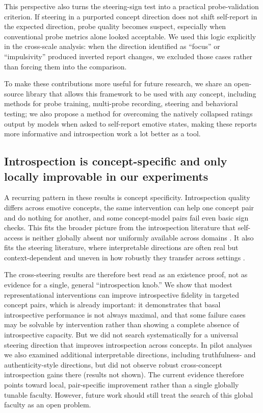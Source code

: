 \documentclass[10pt]{article}
\begin{document}
This perspective also turns the steering-sign test into a practical probe-validation criterion.
If steering in a purported concept direction does not shift self-report in the expected direction, probe quality becomes suspect, especially when conventional probe metrics alone looked acceptable.
We used this logic explicitly in the cross-scale analysis: when the direction identified as ``focus'' or ``impulsivity'' produced inverted report changes, we excluded those cases rather than forcing them into the comparison.

To make these contributions more useful for future research, we share an open-source library that allows this framework to be used with any concept, including methods for probe training, multi-probe recording, steering and behavioral testing; we also propose a method for overcoming the natively collapsed ratings output by models when asked to self-report emotive states, making these reports more informative and introspection work a lot better as a tool.

\subsection{Introspection is concept-specific and only locally improvable in our experiments}

A recurring pattern in these results is concept specificity.
Introspection quality differs across emotive concepts, the same intervention can help one concept pair and do nothing for another, and some concept-model pairs fail even basic sign checks.
This fits the broader picture from the introspection literature that self-access is neither globally absent nor uniformly available across domains \citep{Song2025, Binder2025, JiAn2025}.
It also fits the steering literature, where interpretable directions are often real but context-dependent and uneven in how robustly they transfer across settings \citep{FrisingBalcells2025, Zou2023}.

The cross-steering results are therefore best read as an existence proof, not as evidence for a single, general ``introspection knob.''
We show that modest representational interventions can improve introspective fidelity in targeted concept pairs, which is already important: it demonstrates that basal introspective performance is not always maximal, and that some failure cases may be solvable by intervention rather than showing a complete absence of introspective capacity.
But we did not search systematically for a universal steering direction that improves introspection across concepts. In pilot analyses we also examined additional interpretable directions, including truthfulness- and authenticity-style directions, but did not observe robust cross-concept introspection gains there (results not shown). The current evidence therefore points toward local, pair-specific improvement rather than a single globally tunable faculty. However, future work should still treat the search of this global faculty as an open problem.
\end{document}
